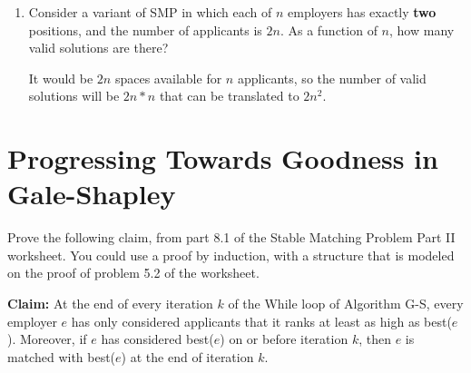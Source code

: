 \documentclass[11pt]{article}
\def\ans#1{{\color{ans}#1}}
\begin{document}
\begin{enumerate}
\item Consider a variant of SMP in which each of $n$ employers has exactly
\textbf{two} positions, and the number of applicants is $2n$.  As a function
of $n$, how many valid solutions are there?

\ans{
  It would be $2n$ spaces available for $n$ applicants, so the number of valid solutions
  will be $2n*n$ that can be translated to $2n^2$.
}

\end{enumerate}

\section{Progressing Towards Goodness in Gale-Shapley}
\label{sec-2}
Prove the following claim, from part 8.1 of the Stable Matching
Problem Part II worksheet. You could use a proof by induction, with a
structure that is modeled on the proof of problem 5.2 of the
worksheet.

\vspace{.1in}

\noindent \textbf{Claim:} At the end of every iteration $k$ of the
While loop of Algorithm G-S, every employer $e$ has only considered
applicants that it ranks at least as high as best($e$).  Moreover, if
$e$ has considered best($e$) on or before iteration $k$, then $e$ is
matched with best($e$) at the end of iteration $k$. \\
\end{document}
